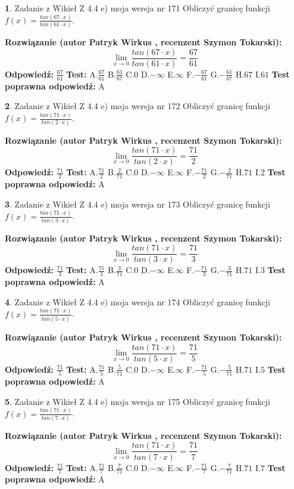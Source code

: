 \documentclass[12pt, a4paper]{article}
\theoremstyle{definition} %
\newtheorem{zad}{}
\newcommand{\zadStart}[1]{\begin{zad}#1\newline}
\newcommand{\zadStop}{\end{zad}}
\newcommand{\rozwStart}[2]{\noindent \textbf{Rozwiązanie (autor #1 , recenzent #2): }\newline}
\newcommand{\rozwStop}{\newline}
\newcommand{\odpStart}{\noindent \textbf{Odpowiedź:}\newline}
\newcommand{\odpStop}{\newline}
\newcommand{\testStart}{\noindent \textbf{Test:}\newline}
\newcommand{\testStop}{\newline}
\newcommand{\kluczStart}{\noindent \textbf{Test poprawna odpowiedź:}\newline}
\newcommand{\kluczStop}{\newline}
\begin{document}
\zadStart{Zadanie z Wikieł Z 4.4 e) moja wersja nr 171}
Obliczyć granicę funkcji $f(x)=\frac{tan(67\cdot x)}{tan(61\cdot x)}$.
\zadStop
\rozwStart{Patryk Wirkus}{Szymon Tokarski}
$$\lim\limits_{x\to 0}\frac{tan(67\cdot x)}{tan(61\cdot x)}=
\frac{67}{61}$$
\rozwStop
\odpStart
$\frac{67}{61}$
\odpStop
\testStart
A.$\frac{67}{61}$
B.$\frac{61}{67}$
C.$0$
D.$-\infty$
E.$\infty$
F.$-\frac{67}{61}$
G.$-\frac{61}{67}$
H.$67$
I.$61$
\testStop
\kluczStart
A
\kluczStop



\zadStart{Zadanie z Wikieł Z 4.4 e) moja wersja nr 172}
Obliczyć granicę funkcji $f(x)=\frac{tan(71\cdot x)}{tan(2\cdot x)}$.
\zadStop
\rozwStart{Patryk Wirkus}{Szymon Tokarski}
$$\lim\limits_{x\to 0}\frac{tan(71\cdot x)}{tan(2\cdot x)}=
\frac{71}{2}$$
\rozwStop
\odpStart
$\frac{71}{2}$
\odpStop
\testStart
A.$\frac{71}{2}$
B.$\frac{2}{71}$
C.$0$
D.$-\infty$
E.$\infty$
F.$-\frac{71}{2}$
G.$-\frac{2}{71}$
H.$71$
I.$2$
\testStop
\kluczStart
A
\kluczStop



\zadStart{Zadanie z Wikieł Z 4.4 e) moja wersja nr 173}
Obliczyć granicę funkcji $f(x)=\frac{tan(71\cdot x)}{tan(3\cdot x)}$.
\zadStop
\rozwStart{Patryk Wirkus}{Szymon Tokarski}
$$\lim\limits_{x\to 0}\frac{tan(71\cdot x)}{tan(3\cdot x)}=
\frac{71}{3}$$
\rozwStop
\odpStart
$\frac{71}{3}$
\odpStop
\testStart
A.$\frac{71}{3}$
B.$\frac{3}{71}$
C.$0$
D.$-\infty$
E.$\infty$
F.$-\frac{71}{3}$
G.$-\frac{3}{71}$
H.$71$
I.$3$
\testStop
\kluczStart
A
\kluczStop



\zadStart{Zadanie z Wikieł Z 4.4 e) moja wersja nr 174}
Obliczyć granicę funkcji $f(x)=\frac{tan(71\cdot x)}{tan(5\cdot x)}$.
\zadStop
\rozwStart{Patryk Wirkus}{Szymon Tokarski}
$$\lim\limits_{x\to 0}\frac{tan(71\cdot x)}{tan(5\cdot x)}=
\frac{71}{5}$$
\rozwStop
\odpStart
$\frac{71}{5}$
\odpStop
\testStart
A.$\frac{71}{5}$
B.$\frac{5}{71}$
C.$0$
D.$-\infty$
E.$\infty$
F.$-\frac{71}{5}$
G.$-\frac{5}{71}$
H.$71$
I.$5$
\testStop
\kluczStart
A
\kluczStop



\zadStart{Zadanie z Wikieł Z 4.4 e) moja wersja nr 175}
Obliczyć granicę funkcji $f(x)=\frac{tan(71\cdot x)}{tan(7\cdot x)}$.
\zadStop
\rozwStart{Patryk Wirkus}{Szymon Tokarski}
$$\lim\limits_{x\to 0}\frac{tan(71\cdot x)}{tan(7\cdot x)}=
\frac{71}{7}$$
\rozwStop
\odpStart
$\frac{71}{7}$
\odpStop
\testStart
A.$\frac{71}{7}$
B.$\frac{7}{71}$
C.$0$
D.$-\infty$
E.$\infty$
F.$-\frac{71}{7}$
G.$-\frac{7}{71}$
H.$71$
I.$7$
\testStop
\kluczStart
A
\kluczStop
\end{document}
